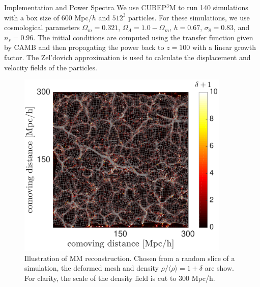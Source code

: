 \begin{section}{Implementation and Power Spectra}
  \label{sec:simulation}
  We use \textsc{CUBEP$^3$M} \cite{bib:Harnois2013} to run
  140 simulations with a box size of 600 Mpc/$h$ and $512^3$ particles.
  For these simulations, we use cosmological
  parameters $\Omega_m=0.321$, $\Omega_{\Lambda}=1.0-\Omega_m$,
  $h=0.67$, $\sigma_8=0.83$, and $n_s=0.96$.
  The initial conditions are computed using the transfer function
  given by CAMB \cite{bib:Lewis2000} and then propagating the power
  back to $z=100$ with a linear growth factor.  The Zel'dovich
  approximation is used to calculate the displacement and velocity
  fields of the particles.

  \begin{figure}[t!]
    \centering
    \includegraphics[width=0.9\textwidth]{fig1.pdf}
    \caption{ Illustration of MM reconstruction.
      Chosen from a random slice of a simulation, the deformed mesh and
      density $\rho/\langle\rho\rangle=1+\delta$ are show.
      For clarity, the scale of the density field is cut to 
      300 Mpc/h.}
    \label{fig:simandrec}
 \end{figure}


\end{section}
